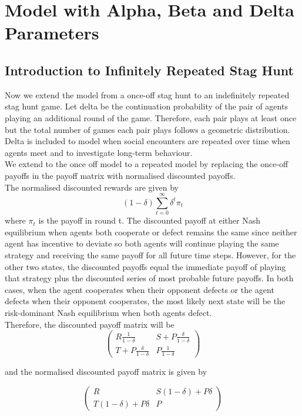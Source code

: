\documentclass[]{llncs}
\begin{document}
\section{Model with Alpha, Beta and Delta Parameters}

\subsection{Introduction to Infinitely Repeated Stag Hunt}

Now we extend the model from a once-off stag hunt to an indefinitely repeated stag hunt game. Let delta be the continuation probability of the pair of agents playing an additional round of the game. Therefore, each pair plays at least once but the total number of games each pair plays follows a geometric distribution. Delta is included to model when social encounters are repeated over time when agents meet and to investigate long-term behaviour. 
\\
We extend to the once off model to a repeated model by replacing the once-off payoffs in the payoff matrix with normalised discounted payoffs. 
\\
The normalised discounted rewards are given by 
\[
(1-\delta) \sum_{t=0}^{\infty} \delta^{t}\pi_t 
\]
where $\pi_t$ is the payoff in round t. 
The discounted payoff at either Nash equilibrium when agents both cooperate or defect remains the same since neither agent has incentive to deviate so both agents will continue playing the same strategy and receiving the same payoff for all future time steps.  However, for the other two states, the discounted payoffs equal the immediate payoff of playing that strategy plus the discounted series of most probable future payoffs. In both cases, when the agent cooperates when their opponent defects or the agent defects when their opponent cooperates, the most likely next state will be the risk-dominant Nash equilibrium when both agents defect.  \\
Therefore, the discounted payoff matrix will be 
\[
  \begin{pmatrix} 
   R\frac{1}{1-\delta} & S + P\frac{\delta}{1-\delta}  \\
   T + P\frac{\delta}{1-\delta}  & P\frac{1}{1-\delta} 
   \end{pmatrix} 
\]

and the normalised discounted payoff matrix is given by 

\[
  \begin{pmatrix} 
   R & S(1-\delta) + P\delta  \\
   T(1-\delta) + P\delta  & P
   \end{pmatrix} 
\]
\end{document}
